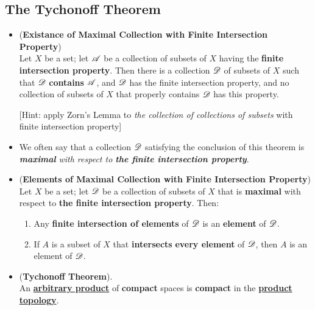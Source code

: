 \documentclass[11pt]{article}
\begin{document}
\subsection{The Tychonoff Theorem}
\begin{itemize}
\item \begin{lemma} (\textbf{Existance of Maximal Collection with Finite Intersection Property}) \citep{munkres2000topology}\\
Let $X$ be a set; let ${\mathscr A}$ be a collection of subsets of $X$ having the \textbf{finite intersection property}. Then there is a collection ${\mathscr D}$ of subsets of $X$ such that ${\mathscr D}$ \textbf{contains} ${\mathscr A}$, and ${\mathscr D}$ has the finite intersection property, and no collection of subsets of $X$ that properly contains ${\mathscr D}$ has this property.
\end{lemma}
[Hint: apply Zorn's Lemma to \emph{the collection of collections of subsets} with finite intersection property]

\item \begin{definition}
We often say that a collection ${\mathscr D}$ satisfying the conclusion of this theorem is \emph{\textbf{maximal}} \emph{with respect to \textbf{the finite intersection property}}.
\end{definition}

\item \begin{lemma} (\textbf{Elements of Maximal Collection with Finite Intersection Property})  \citep{munkres2000topology}\\
Let $X$ be a set; let ${\mathscr D}$ be a collection of subsets of $X$ that is \textbf{maximal} with respect to \textbf{the finite intersection property}. Then:
\begin{enumerate}
\item Any \textbf{finite intersection of elements} of ${\mathscr D}$ is an \textbf{element} of ${\mathscr D}$.
\item If $A$ is a subset of $X$ that \textbf{intersects} \textbf{every element }of ${\mathscr D}$, then $A$ is an element of ${\mathscr D}$.
\end{enumerate}
\end{lemma}

\item \begin{theorem} (\textbf{Tychonoff Theorem}). \citep{munkres2000topology} \\
 An \underline{\textbf{arbitrary product}} of \textbf{compact} spaces is \textbf{compact} in the \underline{\textbf{product topology}}.
\end{theorem}
\end{itemize}
\end{document}
